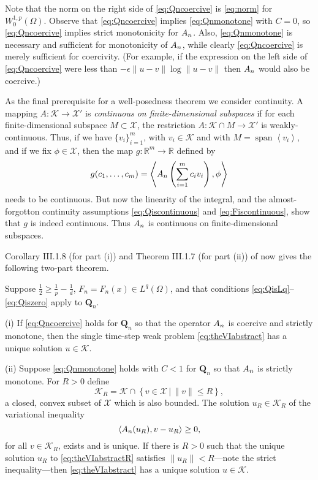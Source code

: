 \documentclass[final,leqno,onefignum,onetabnum]{siamltex1213bueler}
\newcommand\bQ{\mathbf{Q}}
\newcommand\eps{\epsilon}
\newcommand{\ip}[2]{\ensuremath{\left<#1,#2\right>}}
\newcommand\RR{\mathbb{R}}
\begin{document}
Note that the norm on the right side of \eqref{eq:Qncoercive} is \eqref{eq:norm} for $W_0^{1,p}(\Omega)$.  Observe that \eqref{eq:Qncoercive} implies \eqref{eq:Qnmonotone} with $C=0$, so \eqref{eq:Qncoercive} implies strict monotonicity for $A_{n}$.  Also, \eqref{eq:Qnmonotone} is necessary and sufficient for monotonicity of $A_{n}$, while clearly \eqref{eq:Qncoercive} is merely sufficient for coercivity.  (For example, if the expression on the left side of \eqref{eq:Qncoercive} were less than $-\eps \|u-v\| \log \|u-v\|$ then $A_{n}$ would also be coercive.)

As the final prerequisite for a well-posedness theorem we consider continuity.  A mapping $A : \mathcal{K} \to \mathcal{X}'$ is \emph{continuous on finite-dimensional subspaces} if for each finite-dimensional subspace $M\subset \mathcal{X}$, the restriction $A : \mathcal{K}\cap M \to \mathcal{X}'$ is weakly-continuous.  Thus, if we have $\{v_i\}_{i=1}^m$, with $v_i\in\mathcal{K}$ and with $M=\operatorname{span}\left<v_i\right>$, and if we fix $\phi\in\mathcal{X}$, then the map $g:\RR^m \to \RR$ defined by
\begin{equation}
  g(c_1,\dots,c_m) = \ip{\An\left(\sum_{i=1}^m c_i v_i\right)}{\phi}
\end{equation}
needs to be continuous.  But now the linearity of the integral, and the almost-forgotton continuity assumptions \eqref{eq:Qiscontinuous} and \eqref{eq:Fiscontinuous}, show that $g$ is indeed continuous.  Thus $A_{n}$ is continuous on finite-dimensional subspaces.

Corollary III.1.8 (for part (i)) and Theorem III.1.7 (for part (ii)) of \cite{KinderlehrerStampacchia} now gives the following two-part theorem.

\begin{theorem}  \label{thm:firstwellposed}  Suppose $\frac{1}{2} \ge \frac{1}{p} - \frac{1}{d}$, $F_n=F_n(x)\in L^q(\Omega)$, and that conditions \eqref{eq:QisLq}--\eqref{eq:Qiszero} apply to $\bQ_n$.

(i)  If \eqref{eq:Qncoercive} holds for $\bQ_n$ so that the operator $A_{n}$ is coercive and strictly monotone, then the single time-step weak problem \eqref{eq:theVIabstract} has a unique solution $u\in\mathcal{K}$.

(ii) Suppose \eqref{eq:Qnmonotone} holds with $C<1$ for $\bQ_n$ so that $A_{n}$ is strictly monotone.  For $R>0$ define
    $$\mathcal{K}_R = \mathcal{K} \cap \left\{v\in \mathcal{X} \,\Big|\, \|v\|\le R\right\},$$
a closed, convex subset of $\mathcal{X}$ which is also bounded.  The solution $u_R\in \mathcal{K}_R$ of the variational inequality
\begin{equation}
  \ip{\An(u_R)}{v-u_R} \ge 0, \label{eq:theVIabstractR}
\end{equation}
for all $v \in \mathcal{K}_R$, exists and is unique.  If there is $R>0$ such that the unique solution $u_R$ to \eqref{eq:theVIabstractR} satisfies $\|u_R\| < R$---note the strict inequality---then \eqref{eq:theVIabstract} has a unique solution $u\in\mathcal{K}$.
\end{theorem}
\end{document}
